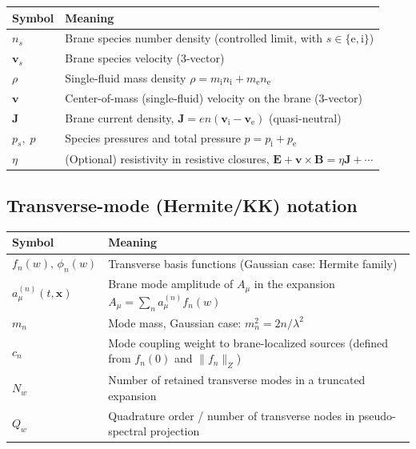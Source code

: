 \documentclass[11pt]{article}
\begin{document}
\begin{center}
\begin{tabular}{@{}ll@{}}
\toprule
Symbol & Meaning \\
\midrule
$n_s$ & Brane species number density (controlled limit, with $s\in\{\mathrm{e},\mathrm{i}\}$) \\
$\mathbf{v}_s$ & Brane species velocity (3-vector) \\
$\rho$ & Single-fluid mass density $\rho=m_{\mathrm{i}}n_{\mathrm{i}}+m_{\mathrm{e}}n_{\mathrm{e}}$ \\
$\mathbf{v}$ & Center-of-mass (single-fluid) velocity on the brane (3-vector) \\
$\mathbf{J}$ & Brane current density, $\mathbf{J}=e n(\mathbf{v}_{\mathrm{i}}-\mathbf{v}_{\mathrm{e}})$ (quasi-neutral) \\
$p_s,\;p$ & Species pressures and total pressure $p=p_{\mathrm{i}}+p_{\mathrm{e}}$ \\
$\eta$ & (Optional) resistivity in resistive closures, $\mathbf{E}+\mathbf{v}\times\mathbf{B}=\eta\mathbf{J}+\cdots$ \\
\bottomrule
\end{tabular}
\end{center}

\subsection*{Transverse-mode (Hermite/KK) notation}

\begin{center}
\begin{tabular}{@{}ll@{}}
\toprule
Symbol & Meaning \\
\midrule
$f_n(w),\,\phi_n(w)$ & Transverse basis functions (Gaussian case: Hermite family) \\
$a_\mu^{(n)}(t,\mathbf{x})$ & Brane mode amplitude of $A_\mu$ in the expansion $A_\mu=\sum_n a_\mu^{(n)} f_n(w)$ \\
$m_n$ & Mode mass, Gaussian case: $m_n^2=2n/\lambda^2$ \\
$c_n$ & Mode coupling weight to brane-localized sources (defined from $f_n(0)$ and $\|f_n\|_Z$) \\
$N_w$ & Number of retained transverse modes in a truncated expansion \\
$Q_w$ & Quadrature order / number of transverse nodes in pseudo-spectral projection \\
\bottomrule
\end{tabular}
\end{center}
\end{document}
